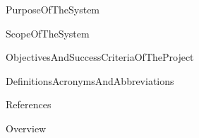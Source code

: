 


{PurposeOfTheSystem}



{ScopeOfTheSystem}



{ObjectivesAndSuccessCriteriaOfTheProject}



{DefinitionsAcronymsAndAbbreviations}
		
		

{References}	
		
		

{Overview}